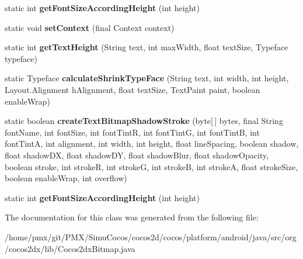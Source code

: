 \begin{DoxyCompactItemize}
static int {\bfseries get\+Font\+Size\+According\+Height} (int height)
\item 
\mbox{\label{classorg_1_1cocos2dx_1_1lib_1_1Cocos2dxBitmap_a496093663e849977e0f7312376f95ac7}} 
static void {\bfseries set\+Context} (final Context context)
\item 
\mbox{\label{classorg_1_1cocos2dx_1_1lib_1_1Cocos2dxBitmap_a0d0a29b7e1e3f37487ddfa0742dfc795}} 
static int {\bfseries get\+Text\+Height} (String text, int max\+Width, float text\+Size, Typeface typeface)
\item 
\mbox{\label{classorg_1_1cocos2dx_1_1lib_1_1Cocos2dxBitmap_ae44f5983f2bf6c31cb07e3255fc64977}} 
static Typeface {\bfseries calculate\+Shrink\+Type\+Face} (String text, int width, int height, Layout.\+Alignment h\+Alignment, float text\+Size, Text\+Paint paint, boolean enable\+Wrap)
\item 
\mbox{\label{classorg_1_1cocos2dx_1_1lib_1_1Cocos2dxBitmap_a654776d8510df2a675e84cf530859371}} 
static boolean {\bfseries create\+Text\+Bitmap\+Shadow\+Stroke} (byte\mbox{[}$\,$\mbox{]} bytes, final String font\+Name, int font\+Size, int font\+TintR, int font\+TintG, int font\+TintB, int font\+TintA, int alignment, int width, int height, float line\+Spacing, boolean shadow, float shadow\+DX, float shadow\+DY, float shadow\+Blur, float shadow\+Opacity, boolean stroke, int strokeR, int strokeG, int strokeB, int strokeA, float stroke\+Size, boolean enable\+Wrap, int overflow)
\item 
\mbox{\label{classorg_1_1cocos2dx_1_1lib_1_1Cocos2dxBitmap_af0a40a8266350683aa94a1abbd43d7c1}} 
static int {\bfseries get\+Font\+Size\+According\+Height} (int height)
\end{DoxyCompactItemize}


The documentation for this class was generated from the following file\+:\begin{DoxyCompactItemize}
\item 
/home/pmx/git/\+P\+M\+X/\+Simu\+Cocos/cocos2d/cocos/platform/android/java/src/org/cocos2dx/lib/Cocos2dx\+Bitmap.\+java\end{DoxyCompactItemize}
